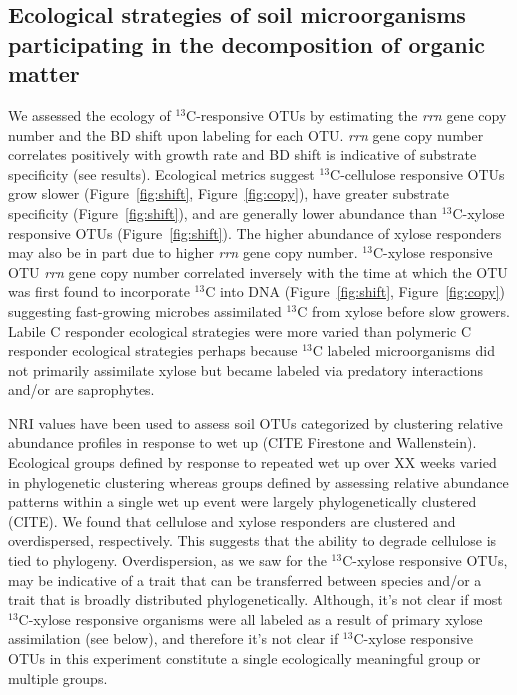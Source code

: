 \subsection{Ecological strategies of soil microorganisms participating in the
decomposition of organic matter}
We assessed the ecology of $^{13}$C-responsive OTUs by estimating the
\textit{rrn} gene copy number and the BD shift upon labeling for each OTU.
\textit{rrn} gene copy number correlates positively with growth rate
\citep{11125085} and BD shift is indicative of substrate specificity (see
results). Ecological metrics suggest $^{13}$C-cellulose responsive OTUs grow
slower (Figure~\ref{fig:shift}, Figure~\ref{fig:copy}), have greater substrate
specificity (Figure~\ref{fig:shift}), and are generally lower abundance than
$^{13}$C-xylose responsive OTUs (Figure~\ref{fig:shift}). The higher abundance
of xylose responders may also be in part due to higher \textit{rrn} gene copy
number. $^{13}$C-xylose responsive OTU \textit{rrn} gene copy number correlated
inversely with the time at which the OTU was first found to incorporate
$^{13}$C into DNA (Figure~\ref{fig:shift}, Figure~\ref{fig:copy}) suggesting
fast-growing microbes assimilated $^{13}$C from xylose before slow growers.
Labile C responder ecological strategies were more varied than polymeric
C responder ecological strategies perhaps because $^{13}$C labeled
microorganisms did not primarily assimilate xylose but became labeled via
predatory interactions and/or are saprophytes. 

NRI values have been used to assess soil OTUs categorized by clustering
relative abundance profiles in response to wet up (CITE Firestone and
Wallenstein). Ecological groups defined by response to repeated wet up over XX
weeks varied in phylogenetic clustering whereas groups defined by assessing
relative abundance patterns within a single wet up event were largely
phylogenetically clustered (CITE). We found that cellulose and xylose
responders are clustered and overdispersed, respectively. This suggests that
the ability to degrade cellulose is tied to phylogeny. Overdispersion, as we
saw for the $^{13}$C-xylose responsive OTUs, may be indicative of a trait that
can be transferred between species and/or a trait that is broadly distributed
phylogenetically. Although, it's not clear if most $^{13}$C-xylose responsive
organisms were all labeled as a result of primary xylose assimilation (see
below), and therefore it's not clear if $^{13}$C-xylose responsive OTUs in this
experiment constitute a single ecologically meaningful group or multiple
groups. 

